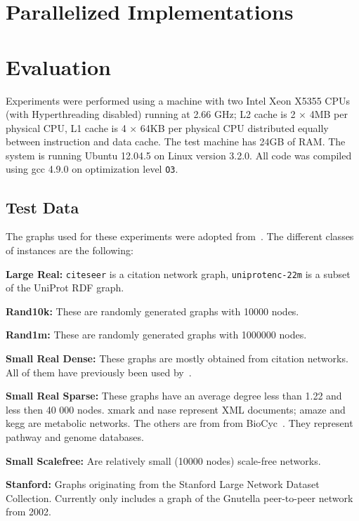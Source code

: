 \documentclass[12pt,a4paper,twoside]{article}
\begin{document}
\section{Parallelized Implementations}

\section{Evaluation}

Experiments were performed using a machine with two Intel Xeon X5355 CPUs (with Hyperthreading disabled) running at 2.66 GHz; L2 cache is 2 $\times$ 4MB per physical CPU, L1 cache is 4 $\times$ 64KB per physical CPU distributed equally between instruction and data cache. The test machine has 24GB of RAM.
The system is running Ubuntu 12.04.5 on Linux version 3.2.0. All code was compiled using gcc 4.9.0 on optimization level \texttt{O3}.

\subsection{Test Data}

The graphs used for these experiments were adopted from~\cite{preach}. The different classes of instances are the following:
\begin{description}
  \item{\textbf{Large Real:}} \verb|citeseer| is a citation network graph, \verb|uniprotenc-22m| is a subset of the UniProt RDF graph.
  \item{\textbf{Rand10k:}} These are randomly generated graphs with 10000 nodes.
  \item{\textbf{Rand1m:}} These are randomly generated graphs with 1000000 nodes.
  \item{\textbf{Small Real Dense:}} These graphs are mostly obtained from citation networks. All of them have previously been used by~\cite{Jin:2009:HIS:1559845.1559930}.
  \item{\textbf{Small Real Sparse:}} These graphs have an average degree less than 1.22 and less then
    40 000 nodes. xmark and nase represent XML documents; amaze and kegg are metabolic
    networks. The others are from from BioCyc~\cite{grail}. They represent pathway and genome
    databases.
  \item{\textbf{Small Scalefree:}} Are relatively small (10000 nodes) scale-free networks.
  \item{\textbf{Stanford:}} Graphs originating from the Stanford Large Network Dataset Collection. Currently only includes a graph of the Gnutella peer-to-peer network from 2002.
\end{description}
\end{document}
